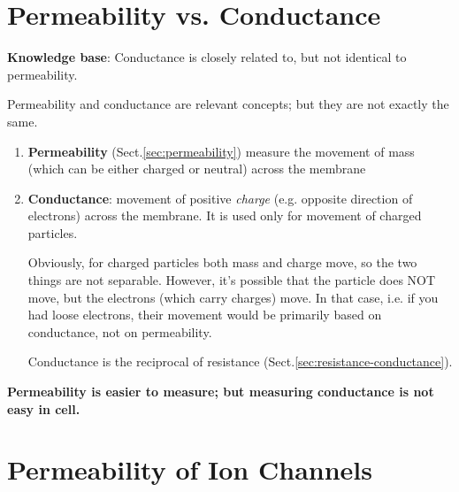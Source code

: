 %



\section{Permeability vs. Conductance}
\label{sec:conductance}
\label{sec:conductance-permeability}

{\bf Knowledge base}: Conductance is closely related to, but not
identical to permeability.

Permeability and conductance are relevant concepts; but they are not exactly the
same.   
\begin{enumerate}
  \item  {\bf Permeability} (Sect.\ref{sec:permeability}) measure the movement
  of mass (which can be either charged or neutral) across the membrane

  \item {\bf Conductance}: movement of positive {\it charge} (e.g.
  opposite direction of electrons) across the membrane.  It is used only for
  movement of charged particles.

Obviously, for charged particles both mass and charge move, so the two things
are not separable. However, it's possible that the particle does NOT move, but
the electrons (which carry charges) move. In that case, i.e. if you had loose
electrons, their movement would be primarily based on conductance, not on
permeability.

Conductance is the reciprocal of resistance  (Sect.\ref{sec:resistance-conductance}).

\end{enumerate}

{\bf Permeability is easier to measure; but measuring conductance is not easy in
cell.}


\section{Permeability of Ion Channels}
\label{sec:permeability-ions}



